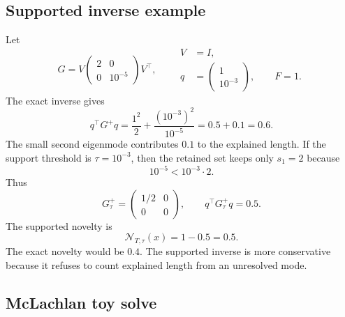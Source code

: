 \documentclass[10pt,twocolumn]{article}
\newcommand{\nov}{\mathcal N}
\begin{document}
\subsection{Supported inverse example}

Let
\begin{equation}
G=V\begin{pmatrix}2&0\\0&10^{-5}\end{pmatrix}V^\top,
\qquad
\begin{aligned}
V&=I,\\
q&=\begin{pmatrix}1\\10^{-3}\end{pmatrix},
\qquad F=1.
\end{aligned}
\end{equation}
The exact inverse gives
\begin{equation}
q^\top G^+q
=
\frac{1^2}{2}
+\frac{(10^{-3})^2}{10^{-5}}
=0.5+0.1=0.6.
\end{equation}
The small second eigenmode contributes $0.1$ to the explained length. If the support threshold is $\tau=10^{-3}$, then the retained set keeps only $s_1=2$ because
\begin{equation}
10^{-5}<10^{-3}\cdot2.
\end{equation}
Thus
\begin{equation}
G_\tau^+
=
\begin{pmatrix}1/2&0\\0&0\end{pmatrix},
\qquad
q^\top G_\tau^+q=0.5.
\end{equation}
The supported novelty is
\begin{equation}
\nov_{T,\tau}(x)=1-0.5=0.5.
\end{equation}
The exact novelty would be $0.4$. The supported inverse is more conservative because it refuses to count explained length from an unresolved mode.

\subsection{McLachlan toy solve}
\end{document}
